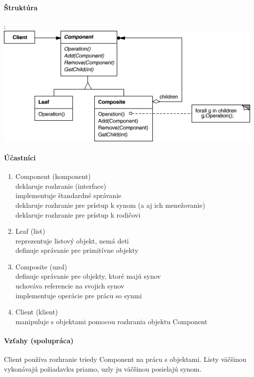 		\paragraph{Štruktúra}

		:\\
			\includegraphics[width=.9\textwidth]{images/composite2}

		\paragraph{Účastníci}
			\begin{enumerate}
				\item Component (komponent)\\
				deklaruje rozhranie (interface)\\
				implementuje štandardné správanie\\
				deklaruje rozhranie pre prístup k synom (a aj ich menežovanie)\\
				deklaruje rozhranie pre prístup k rodičovi
				\item Leaf (list)\\
				reprezentuje listový objekt, nemá deti\\
				definuje správanie pre primitívne objekty
				\item Composite (uzol)\\
				definuje správanie pre objekty, ktoré majú synov\\
				uchováva referencie na svojich synov\\
				implementuje operácie pre prácu so synmi
				\item Client (klient)\\
				manipuluje s objektami pomocou rozhrania objektu Component
			\end{enumerate}
		\paragraph{Vzťahy (spolupráca)}
		Client používa rozhranie triedy Component na prácu s objektami. Listy väčšinou vykonávajú požiadavku priamo, uzly ju väčšinou posielajú synom.

